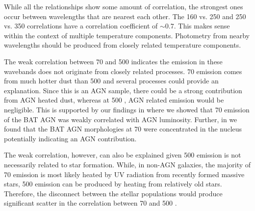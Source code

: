 While all the relationships show some amount of correlation, the strongest ones occur between wavelengths that are nearest each other. The 160 vs. 250 \um{} and 250 vs. 350 \um{} correlations have a correlation coefficient of $\sim0.7$. This makes sense within the context of multiple temperature components. Photometry from nearby wavelengths should be produced from closely related temperature components.

The weak correlation between 70 and 500 \micron{} indicates the emission in these wavebands does not originate from closely related processes. 70 \micron{} emission comes from much hotter dust than 500 \micron{} and several processes could provide an explanation. Since this is an AGN sample, there could be a strong contribution from AGN heated dust, whereas at 500 \micron{}, AGN related emission would be negligible. This is supported by our findings in \citet{Melendez:2014yu} where we showed that 70 \micron{} emission of the BAT AGN was weakly correlated with AGN luminosity. Further, in \citep{Mushotzky:2014ad} we found that the BAT AGN morphologies at 70 \micron{} were concentrated in the nucleus potentially indicating an AGN contribution.

The weak correlation, however, can also be explained given 500 \micron{} emission is not necessarily related to star formation. While, in non-AGN galaxies, the majority of 70 \micron{} emission is most likely heated by UV radiation from recently formed massive stars, 500 \micron{} emission can be produced by heating from relatively old stars. Therefore, the disconnect between the stellar populations would produce significant scatter in the correlation between 70 and 500 \micron.